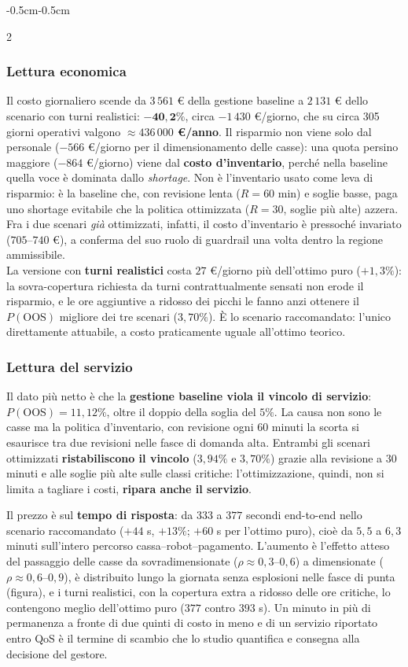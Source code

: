 \documentclass{article}
\begin{document}
\begin{adjustwidth}{-0.5cm}{-0.5cm}
\begin{multicols}{2}
\subsubsection*{Lettura economica}
Il costo giornaliero scende da $3\,561$ \euro{} della gestione baseline a $2\,131$ \euro{} dello
scenario con turni realistici: $\mathbf{-40{,}2\%}$, circa $-1\,430$ \euro/giorno, che su circa
305 giorni operativi valgono \textbf{$\approx 436\,000$ \euro/anno}. Il risparmio non viene solo
dal personale ($-566$ \euro/giorno per il dimensionamento delle casse): una quota persino maggiore
($-864$ \euro/giorno) viene dal \textbf{costo d'inventario}, perché nella baseline quella voce è
dominata dallo \emph{shortage}. Non è l'inventario
usato come leva di risparmio: è la baseline che, con revisione
lenta ($R = 60$ min) e soglie basse, paga uno shortage evitabile che la politica ottimizzata
($R = 30$, soglie più alte) azzera. Fra i due scenari \emph{già} ottimizzati, infatti, il costo
d'inventario è pressoché invariato ($705$--$740$ \euro), a conferma del suo ruolo di guardrail una
volta dentro la regione ammissibile.\\La versione con \textbf{turni realistici} costa $27$ \euro/giorno più dell'ottimo puro
($+1{,}3\%$): la sovra-copertura richiesta da turni contrattualmente sensati non erode il
risparmio, e le ore aggiuntive a ridosso dei picchi le fanno anzi ottenere il $P(\text{OOS})$
migliore dei tre scenari ($3{,}70\%$). È lo scenario raccomandato: l'unico direttamente attuabile,
a costo praticamente uguale all'ottimo teorico.

\subsubsection*{Lettura del servizio}
Il dato più netto è che la \textbf{gestione baseline viola il vincolo di servizio}:
$P(\text{OOS}) = 11{,}12\%$, oltre il doppio della soglia del $5\%$. La causa non sono le casse ma
la politica d'inventario, con revisione ogni $60$ minuti la scorta si esaurisce tra due
revisioni nelle fasce di domanda alta. Entrambi gli scenari ottimizzati \textbf{ristabiliscono il
vincolo} ($3{,}94\%$ e $3{,}70\%$) grazie alla revisione a $30$ minuti e alle soglie più alte sulle
classi critiche: l'ottimizzazione, quindi, non si limita a tagliare i costi, \textbf{ripara anche
il servizio}.

Il prezzo è sul \textbf{tempo di risposta}: da $333$ a $377$ secondi end-to-end nello scenario
raccomandato ($+44$ s, $+13\%$; $+60$ s per l'ottimo puro), cioè da $5{,}5$ a $6{,}3$ minuti
sull'intero percorso cassa--robot--pagamento. L'aumento è l'effetto atteso del passaggio delle
casse da sovradimensionate ($\rho \approx 0{,}3$--$0{,}6$) a dimensionate
($\rho \approx 0{,}6$--$0{,}9$), è distribuito lungo la giornata senza esplosioni nelle fasce di
punta (figura), e i turni realistici, con la copertura extra a ridosso delle ore critiche, lo
contengono meglio dell'ottimo puro ($377$ contro $393$ s). Un minuto in più di permanenza a fronte
di due quinti di costo in meno e di un servizio riportato entro QoS è il termine di scambio che
lo studio quantifica e consegna alla decisione del gestore.
\end{multicols}

\end{adjustwidth}
\end{document}
